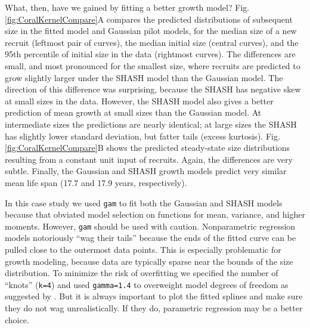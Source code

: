 \documentclass[12pt]{article}
\begin{document}
\begin{spacing}{1.35}
What, then, have we gained by fitting a better growth model? 
Fig. \ref{fig:CoralKernelCompare}A compares the predicted distributions of subsequent size in the fitted model and Gaussian pilot models, for the median size of a new recruit (leftmost pair of curves), the median initial size (central curves), and the 95th percentile of initial size in the data (rightmost curves). 
The differences are small, and most pronounced for the smallest size, where recruits are predicted to grow slightly larger under the SHASH model than the Gaussian model. 
The direction of this difference was surprising, because the SHASH has negative skew at small sizes in the data. 
However, the SHASH model also gives a better prediction of mean growth at small sizes than the Gaussian model. 
At intermediate sizes the predictions are nearly identical; at large sizes the SHASH has slightly lower standard deviation, but fatter tails (excess kurtosis).  
Fig. \ref{fig:CoralKernelCompare}B shows the predicted steady-state size distributions resulting from a constant unit input of recruits. 
Again, the differences are very subtle. 
Finally, the Gaussian and SHASH growth models predict very similar mean life span (17.7 and 17.9 years, respectively).

In this case study we used \texttt{gam} to fit both the Gaussian and SHASH models because that obviated model selection on functions for mean, variance, and higher moments. 
However, \texttt{gam} should be used with caution. 
Nonparametric regression models notoriously ``wag their tails'' because the ends of the fitted curve can be pulled close to the outermost data points. 
This is especially problematic for growth modeling, because data are typically sparse near the bounds of the size distribution. 
To minimize the risk of overfitting we specified the number of ``knots'' (\texttt{k=4}) and used \texttt{gamma=1.4} to overweight model degrees of freedom as suggested by \citet[][sec. 3.2]{gu-2013}. 
But it is always important to plot the fitted splines and make sure they do not wag unrealistically. 
If they do, parametric regression may be a better choice. 


\end{spacing}
\end{document}
